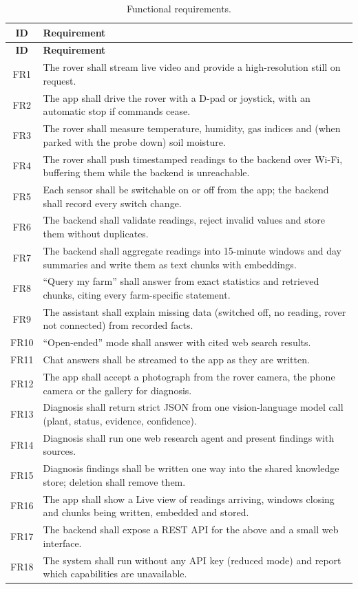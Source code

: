 {\small
\begin{longtable}{|c|P{12.2cm}|}
\caption{Functional requirements.}\label{tab:fr}\\
\hline
\textbf{ID} & \textbf{Requirement}\\\hline
\endfirsthead
\hline
\textbf{ID} & \textbf{Requirement}\\\hline
\endhead
FR1 & The rover shall stream live video and provide a high-resolution still on request.\\\hline
FR2 & The app shall drive the rover with a D-pad or joystick, with an automatic stop if commands cease.\\\hline
FR3 & The rover shall measure temperature, humidity, gas indices and (when parked with the probe down) soil moisture.\\\hline
FR4 & The rover shall push timestamped readings to the backend over Wi-Fi, buffering them while the backend is unreachable.\\\hline
FR5 & Each sensor shall be switchable on or off from the app; the backend shall record every switch change.\\\hline
FR6 & The backend shall validate readings, reject invalid values and store them without duplicates.\\\hline
FR7 & The backend shall aggregate readings into 15-minute windows and day summaries and write them as text chunks with embeddings.\\\hline
FR8 & ``Query my farm'' shall answer from exact statistics and retrieved chunks, citing every farm-specific statement.\\\hline
FR9 & The assistant shall explain missing data (switched off, no reading, rover not connected) from recorded facts.\\\hline
FR10 & ``Open-ended'' mode shall answer with cited web search results.\\\hline
FR11 & Chat answers shall be streamed to the app as they are written.\\\hline
FR12 & The app shall accept a photograph from the rover camera, the phone camera or the gallery for diagnosis.\\\hline
FR13 & Diagnosis shall return strict JSON from one vision-language model call (plant, status, evidence, confidence).\\\hline
FR14 & Diagnosis shall run one web research agent and present findings with sources.\\\hline
FR15 & Diagnosis findings shall be written one way into the shared knowledge store; deletion shall remove them.\\\hline
FR16 & The app shall show a Live view of readings arriving, windows closing and chunks being written, embedded and stored.\\\hline
FR17 & The backend shall expose a REST API for the above and a small web interface.\\\hline
FR18 & The system shall run without any API key (reduced mode) and report which capabilities are unavailable.\\\hline
\end{longtable}
}

